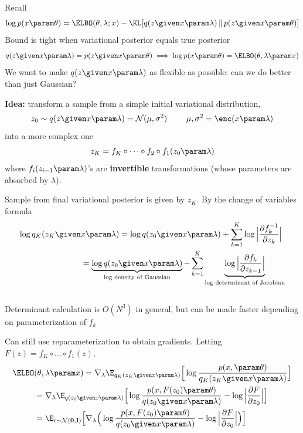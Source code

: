 \begin{frame}
Recall
\[ \log p(x \param \theta)  = \ELBO(\theta, \lambda; x) - \KL[q(z \given x \param \lambda)  \, \Vert \, p(z \given x \param \theta)]  \]
Bound is tight when variational posterior equals true posterior
\[ q(z \given x \param \lambda) = p(z \given x \param \theta) \implies \log p(x \param \theta) = \ELBO( \theta,  \lambda \param x) \]
We want to make $q(z \given x \param \lambda)$ as flexible as possible:
can we do better than just Gaussian?
\end{frame} 

\begin{frame}
\textbf{Idea:} transform a sample from a simple initial variational distribution, 
\[ z_0 \sim q(z \given x \param \lambda) = \mathcal{N}(\mu, \sigma^2) \,\,\,\,\,\,\,\,\,\,\,\,\,\, \mu, \sigma^2 = \enc(x \param \lambda)\]
into a more complex one
\[ z_K = f_K \circ \dots \circ f_2 \circ f_1(z_0 \param \lambda)\]
where $f_i(z_{i-1}\param \lambda)$'s are \textbf{invertible} transformations (whose parameters are
absorbed by $\lambda$).
\end{frame} 


\begin{frame}
Sample from final variational posterior is given by $z_K$. By the change of variables formula
\begin{align*}
\log q_K(z_K \given &x \param \lambda) = \log q(z_0 \given x \param \lambda) + 
\sum_{k=1}^K \log \Big | \frac{\partial f_k^{-1}}{\partial z_{k}}\Big |  \\
&=\underbrace{\log q(z_0 \given x \param \lambda)}_{\text{log density of Gaussian}} - 
\sum_{k=1}^K \underbrace{\log \Big | \frac{\partial f_k}{\partial z_{k-1}}\Big |}_{\text{log determinant of Jacobian}} 
\end{align*}
\\
\vspace{5mm}
Determinant calculation is $O(N^3)$ in general, but can be made faster depending on parameterization of $f_k$ 
\end{frame} 

\begin{frame}
Can still use reparameterization  to obtain gradients.  Letting $F(z) = f_{K} \circ \dots \circ f_1 (z) $,
\begin{align*}
\ELBO&(\theta, \lambda \param x) = \nabla_\lambda \E_{q_K(z_K \given x \param \lambda)}\Big[\log \frac{p (x,  \param \theta)}{q_K(z_K \given x \param \lambda)}\Big] \\
&= \nabla_\lambda \E_{q(z_0 \given x \param \lambda)}\Big[\log \frac{p (x, F(z_0) \param \theta)}{q(z_0 \given x \param \lambda)} - \log \Big| \frac{\partial F}{\partial z_0}\Big|\Big] \\
&=  \E_{\epsilon \sim \mathcal{N}(\mathbf{0}, \mathbf{I})}\Big[\nabla_\lambda \Big( \log \frac{p (x, F(z_0) \param \theta)}{q(z_0 \given x \param \lambda)} - \log \Big| \frac{\partial F}{\partial z_0}\Big|\Big) \Big] 
\end{align*}
\end{frame} 

